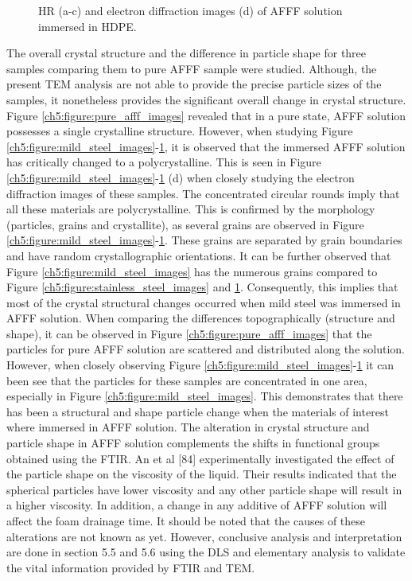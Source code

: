 \documentclass[12pt]{report}
\begin{document}
\begin{figure}[H]
\caption{HR (a-c) and electron diffraction images (d) of AFFF solution immersed in HDPE.}
\label{ch5:figure:hdpe_images}
\end{figure}

The overall crystal structure and the difference in particle shape for three samples comparing them to pure AFFF sample were studied. Although, the present TEM analysis are not able to provide the precise particle sizes of the samples, it nonetheless provides the significant overall change in crystal structure. Figure \ref{ch5:figure:pure_afff_images} revealed that in a pure state, AFFF solution possesses a single crystalline structure. However, when studying Figure \ref{ch5:figure:mild_steel_images}-\ref{ch5:figure:hdpe_images}, it is observed that the immersed AFFF solution has critically changed to a polycrystalline. This is seen in Figure \ref{ch5:figure:mild_steel_images}-\ref{ch5:figure:hdpe_images} (d) when closely studying the electron diffraction images of these samples. The concentrated circular rounds imply that all these materials are polycrystalline. This is confirmed by the morphology (particles, grains and crystallite), as several grains are observed in Figure \ref{ch5:figure:mild_steel_images}-\ref{ch5:figure:hdpe_images}. These grains are separated by grain boundaries and have random crystallographic orientations. It can be further observed that Figure \ref{ch5:figure:mild_steel_images} has the numerous grains compared to Figure \ref{ch5:figure:stainless_steel_images} and \ref{ch5:figure:hdpe_images}.  Consequently, this implies that most of the crystal structural changes occurred when mild steel was immersed in AFFF solution. 
When comparing the differences topographically (structure and shape), it can be observed in Figure \ref{ch5:figure:pure_afff_images} that the particles for pure AFFF solution are scattered and distributed along the solution. However, when closely observing Figure \ref{ch5:figure:mild_steel_images}-\ref{ch5:figure:hdpe_images} it can been see that the particles for these samples are concentrated in one area, especially in Figure \ref{ch5:figure:mild_steel_images}. This demonstrates that there has been a structural and shape particle change when the materials of interest where immersed in AFFF solution. The alteration in crystal structure and particle shape in AFFF solution complements the shifts in functional groups obtained using the FTIR. An et al [84] experimentally investigated the effect of the particle shape on the viscosity of the liquid. Their results indicated that the spherical particles have lower viscosity and any other particle shape will result in a higher viscosity. In addition, a change in any additive of AFFF solution will affect the foam drainage time. It should be noted that the causes of these alterations are not known as yet. However, conclusive analysis and interpretation are done in section 5.5 and 5.6 using the DLS and elementary analysis to validate the vital information provided by FTIR and TEM.
\end{document}
